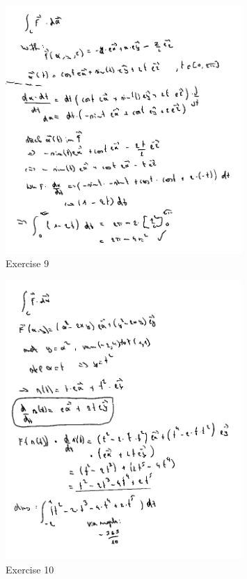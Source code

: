 \documentclass[a4paper]{article}
\begin{document}
\begin{figure}[H]
	\centering
	\includegraphics[width=0.8\textwidth]{assets/huis_6_ex_9.png}
	\caption{Exercise 9}
	\label{fig:huis_6_ex_9}
\end{figure}


\begin{figure}[H]
	\centering
	\includegraphics[width=0.8\textwidth]{assets/huis_6_ex_10.png}
	\caption{Exercise 10}
	\label{fig:huis_6_ex_10}
\end{figure}
\end{document}
